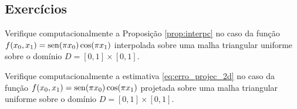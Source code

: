 \subsection*{Exercícios}

\begin{exer}
  Verifique computacionalmente a Proposição \ref{prop:interpc} no caso da função $f(x_0,x_1) = \operatorname{sen}(\pi x_0)\cos(\pi x_1)$ interpolada sobre uma malha triangular uniforme sobre o domínio $D = [0, 1]\times [0, 1]$.
\end{exer}

\begin{exer}
  Verifique computacionalmente a estimativa \eqref{eq:erro_projec_2d} no caso da função $f(x_0,x_1) = \operatorname{sen}(\pi x_0)\cos(\pi x_1)$ projetada sobre uma malha triangular uniforme sobre o domínio $D = [0, 1]\times [0, 1]$.
\end{exer}